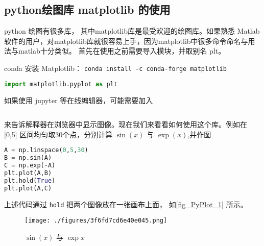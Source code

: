 
\subsection{python绘图库 matplotlib 的使用}

python 绘图有很多库， 其中matplotlib库是最受欢迎的绘图库。如果熟悉 Matlab 软件的用户，对matplotlib库就很容易上手，因为matplotlib中很多命令命名与用法与matlab十分类似。 首先在使用之前需要导入模块，并取别名 plt。

conda 安装 Matplotlib： \verb|conda install -c conda-forge matplotlib|

\begin{lstlisting}[language=python]
import matplotlib.pyplot as plt
\end{lstlisting}
如果使用 jupyter 等在线编辑器，可能需要加入
\begin{lstlisting}[language=python]
% matplotlib inline
\end{lstlisting}
来告诉解释器在浏览器中显示图像。现在我们来看看如何使用这个库。例如在 [0,5] 区间均匀取30个点，分别计算 $\sin(x)$ 与 $\exp(x)$,并作图
\begin{lstlisting}[language=python]
A = np.linspace(0,5,30) 
B = np.sin(A)
C = np.exp(-A)
plt.plot(A,B)
plt.hold(True)
plt.plot(A,C)
\end{lstlisting}
上述代码通过 \verb|hold| 把两个图像放在一张画布上面， 如\autoref{fig_PyPlot_1} 所示。
\begin{figure}[ht]
\centering
\texttt{[image: ./figures/3f6fd7cd6e40e045.png]}
\caption{$\sin(x)$ 与 $\exp{x}$} \label{fig_PyPlot_1}
\end{figure}



